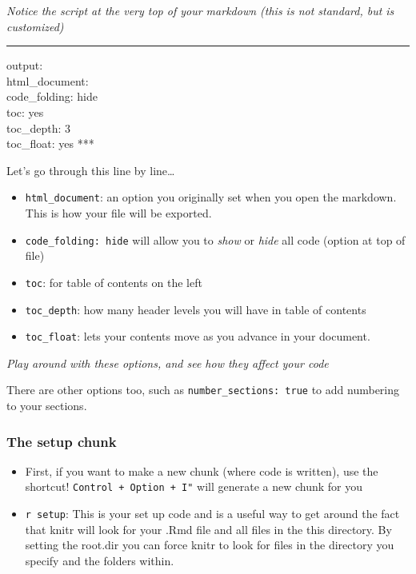 \documentclass[
]{article}
\providecommand{\tightlist}{%
  \setlength{\itemsep}{0pt}\setlength{\parskip}{0pt}}
\begin{document}
\emph{Notice the script at the very top of your markdown (this is not
standard, but is customized)}

\begin{center}\rule{0.5\linewidth}{0.5pt}\end{center}

output:\\
html\_document:\\
code\_folding: hide\\
toc: yes\\
toc\_depth: 3\\
toc\_float: yes ***

Let's go through this line by line\ldots{}

\begin{itemize}
\tightlist
\item
  \texttt{html\_document}: an option you originally set when you open
  the markdown. This is how your file will be exported.\\
\item
  \texttt{code\_folding:\ hide} will allow you to \emph{show} or
  \emph{hide} all code (option at top of file)\\
\item
  \texttt{toc}: for table of contents on the left\\
\item
  \texttt{toc\_depth}: how many header levels you will have in table of
  contents\\
\item
  \texttt{toc\_float}: lets your contents move as you advance in your
  document.
\end{itemize}

\emph{Play around with these options, and see how they affect your code}

There are other options too, such as \texttt{number\_sections:\ true} to
add numbering to your sections.

\hypertarget{the-setup-chunk}{%
\subsubsection{The setup chunk}\label{the-setup-chunk}}

\begin{itemize}
\item
  First, if you want to make a new chunk (where code is written), use
  the shortcut! \texttt{Control\ +\ Option\ +\ I"} will generate a new
  chunk for you
\item
  \texttt{r\ setup}: This is your set up code and is a useful way to get
  around the fact that knitr will look for your .Rmd file and all files
  in the this directory. By setting the root.dir you can force knitr to
  look for files in the directory you specify and the folders within.
\end{itemize}
\end{document}

